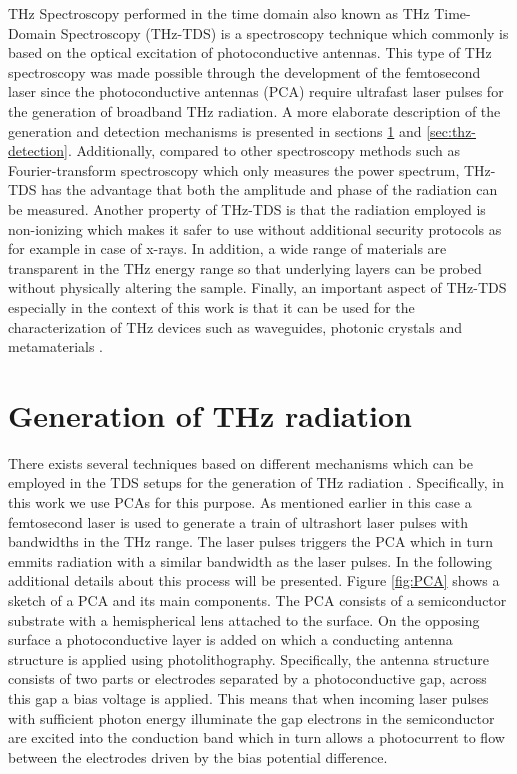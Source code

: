 THz Spectroscopy performed in the time domain also known as THz Time-Domain Spectroscopy (THz-TDS) is a spectroscopy technique which commonly is based on the optical excitation of photoconductive antennas. This type of THz spectroscopy was made possible through the development of the femtosecond laser since the photoconductive antennas (PCA) require ultrafast laser pulses for the generation of broadband THz radiation. A more elaborate description of the generation and detection mechanisms is presented in sections \ref{sec:thz-generation} and \ref{sec:thz-detection}. Additionally, compared to other spectroscopy methods such as Fourier-transform spectroscopy which only measures the power spectrum, THz-TDS has the advantage that both the amplitude and phase of the radiation can be measured. Another property of THz-TDS is that the radiation employed is non-ionizing which makes it safer to use without additional security protocols as for example in case of x-rays. In addition, a wide range of materials are transparent in the THz energy range so that underlying layers can be probed without physically altering the sample. Finally, an important aspect of THz-TDS especially in the context of this work is that it can be used for the characterization of THz devices such as waveguides, photonic crystals and metamaterials \cite{Horlick68, Jepsen2011}.

\section{Generation of THz radiation}
\label{sec:thz-generation}
There exists several techniques based on different mechanisms which can be employed in the TDS setups for the generation of THz radiation \cite{Jepsen2011}. Specifically, in this work we use PCAs for this purpose. As mentioned earlier in this case a femtosecond laser is used to generate a train of ultrashort laser pulses with bandwidths in the THz range. The laser pulses triggers the PCA which in turn emmits radiation with a similar bandwidth as the laser pulses. In the following additional details about this process will be presented.
Figure \ref{fig:PCA} shows a sketch of a PCA and its main components. The PCA consists of a semiconductor substrate with a hemispherical lens attached to the surface. On the opposing surface a photoconductive layer is added on which a conducting antenna structure is applied using photolithography. Specifically, the antenna structure consists of two parts or electrodes separated by a photoconductive gap, across this gap a bias voltage is applied. This means that when incoming laser pulses with sufficient photon energy illuminate the gap electrons in the semiconductor are excited into the conduction band which in turn allows a photocurrent to flow between the electrodes driven by the bias potential difference. 


